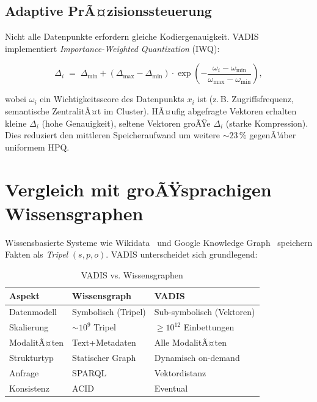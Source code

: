 ﻿\documentclass[12pt,a4paper]{article}
\begin{document}
\subsection{Adaptive PrÃ¤zisionssteuerung}

Nicht alle Datenpunkte erfordern gleiche Kodiergenauigkeit.
VADIS implementiert \emph{Impor\-tance-Weighted Quantization} (IWQ):

\begin{equation}
  \Delta_i \;=\; \Delta_{\min} + (\Delta_{\max} - \Delta_{\min})
  \cdot \exp\!\left(-\frac{\omega_i - \omega_{\min}}
                          {\omega_{\max} - \omega_{\min}}\right),
\end{equation}

wobei $\omega_i$ ein Wichtigkeitsscore des Datenpunkts $x_i$
ist (z.\,B. Zugriffsfrequenz, semantische ZentralitÃ¤t im
Cluster). HÃ¤ufig abgefragte Vektoren erhalten kleine $\Delta_i$
(hohe Genauigkeit), seltene Vektoren groÃŸe $\Delta_i$ (starke
Kompression). Dies reduziert den mittleren Speicheraufwand
um weitere $\sim 23\,\%$ gegenÃ¼ber uniformem HPQ.

\section{Vergleich mit groÃŸsprachigen Wissensgraphen}
\label{sec:kg}

Wissensbasierte Systeme wie Wikidata~\cite{vrandevcic2014wikidata}
und Google Knowledge Graph~\cite{singhal2012kg} speichern
Fakten als \emph{Tripel} $(s, p, o)$. VADIS unterscheidet sich
grundlegend:

\begin{table}[ht]
\centering
\small
\caption{VADIS vs. Wissensgraphen}
\label{tab:vs_kg}
\begin{tabular}{@{}p{1.8cm}p{2.4cm}p{2.4cm}@{}}
\toprule
\textbf{Aspekt} & \textbf{Wissensgraph} & \textbf{VADIS} \\
\midrule
Datenmodell & Symbolisch (Tripel) & Sub-symbolisch (Vektoren) \\
Skalierung & $\sim 10^9$ Tripel & $\geq 10^{12}$ Einbettungen \\
ModalitÃ¤ten & Text+Metadaten & Alle ModalitÃ¤ten \\
Strukturtyp & Statischer Graph & Dynamisch on-demand \\
Anfrage & SPARQL & Vektordistanz \\
Konsistenz & ACID & Eventual \\
\bottomrule
\end{tabular}
\end{table}
\end{document}
